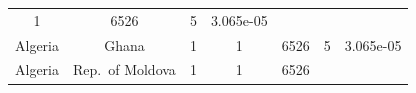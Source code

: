 \documentclass[10pt,]{article}
\begin{document}
\begin{longtable}[]{@{}ccccccc@{}}
\begin{minipage}[t]{0.08\columnwidth}
1\strut
\end{minipage} & \begin{minipage}[t]{0.13\columnwidth}\centering\strut
6526\strut
\end{minipage} & \begin{minipage}[t]{0.10\columnwidth}\centering\strut
5\strut
\end{minipage} & \begin{minipage}[t]{0.10\columnwidth}\centering\strut
3.065e-05\strut
\end{minipage}\tabularnewline
\begin{minipage}[t]{0.11\columnwidth}\centering\strut
Algeria\strut
\end{minipage} & \begin{minipage}[t]{0.16\columnwidth}\centering\strut
Ghana\strut
\end{minipage} & \begin{minipage}[t]{0.11\columnwidth}\centering\strut
1\strut
\end{minipage} & \begin{minipage}[t]{0.08\columnwidth}\centering\strut
1\strut
\end{minipage} & \begin{minipage}[t]{0.13\columnwidth}\centering\strut
6526\strut
\end{minipage} & \begin{minipage}[t]{0.10\columnwidth}\centering\strut
5\strut
\end{minipage} & \begin{minipage}[t]{0.10\columnwidth}\centering\strut
3.065e-05\strut
\end{minipage}\tabularnewline
\begin{minipage}[t]{0.11\columnwidth}\centering\strut
Algeria\strut
\end{minipage} & \begin{minipage}[t]{0.16\columnwidth}\centering\strut
Rep.~of Moldova\strut
\end{minipage} & \begin{minipage}[t]{0.11\columnwidth}\centering\strut
1\strut
\end{minipage} & \begin{minipage}[t]{0.08\columnwidth}\centering\strut
1\strut
\end{minipage} & \begin{minipage}[t]{0.13\columnwidth}\centering\strut
6526\strut
\end{minipage} & \begin{minipage}[t]{0.10\columnwidth}\centering\strut

\end{minipage}
\end{longtable}
\end{document}

